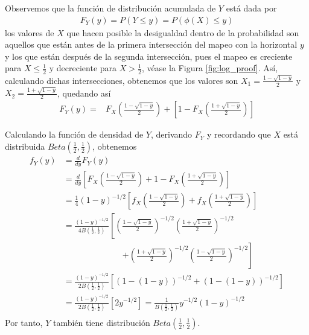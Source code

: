 \documentclass[../Main.tex]{subfiles}
\begin{document}
\begin{demostracion}{}{}
Observemos que la función de distribución acumulada de $Y$ está dada por \begin{align*}
    F_Y(y)=P(Y\leq y)=P(\phi(X)\leq y)
\end{align*}
los valores de $X$ que hacen posible la desigualdad dentro de la probabilidad son aquellos que están antes de la primera intersección del mapeo con la horizontal $y$ y los que están después de la segunda intersección, pues el mapeo es creciente para $X\leq \frac{1}{2}$ y decreciente para $X>\frac{1}{2}$, véase la Figura \ref{fig:log_proof}. Así, calculando dichas intersecciones, obtenemos que los valores son $X_1=\frac{1-\sqrt{1-y}}{2}$ y $X_2=\frac{1+\sqrt{1-y}}{2}$, quedando así 
\begin{align*}
    F_Y(y)=&F_X\left(\frac{1-\sqrt{1-y}}{2}\right)+\left[1-F_X\left(\frac{1+\sqrt{1-y}}{2}\right)\right]
\end{align*}

Calculando la función de densidad de $Y$, derivando $F_Y$ y recordando que $X$ está distribuida $Beta\left(\frac{1}{2},\frac{1}{2}\right)$, obtenemos
\begin{align*}
f_Y(y) &= \frac{d}{dy} F_Y(y) \\
       &= \frac{d}{dy} \left[ F_X\left( \frac{1 - \sqrt{1 - y}}{2} \right) + 1 - F_X\left( \frac{1 + \sqrt{1 - y}}{2} \right) \right] \\
       &= \frac{1}{4} (1 - y)^{-1/2} \left[ f_X\left( \frac{1 - \sqrt{1 - y}}{2} \right) + f_X\left( \frac{1 + \sqrt{1 - y}}{2} \right) \right] \\
       &= \frac{(1 - y)^{-1/2}}{4B\left( \frac{1}{2}, \frac{1}{2} \right)} \left[ \left( \frac{1 - \sqrt{1 - y}}{2} \right)^{-1/2}\left( \frac{1 + \sqrt{1 - y}}{2} \right)^{-1/2} \right. \\
       & \qquad\qquad\qquad\quad \left. + \left( \frac{1 + \sqrt{1 - y}}{2} \right)^{-1/2}\left( \frac{1 - \sqrt{1 - y}}{2} \right)^{-1/2} \right] \\
       &= \frac{(1 - y)^{-1/2}}{2B\left( \frac{1}{2}, \frac{1}{2} \right)} \left[ \left( 1 - (1 - y) \right)^{-1/2} + \left( 1 - (1 - y) \right)^{-1/2} \right] \\
       &= \frac{(1 - y)^{-1/2}}{2B\left( \frac{1}{2}, \frac{1}{2} \right)} \left[ 2y^{-1/2} \right]=  \frac{1}{B\left( \frac{1}{2}, \frac{1}{2} \right)}  y^{-1/2}(1 - y)^{-1/2} \\
\end{align*}
 Por tanto, $Y$ también tiene distribución $Beta\left(\frac{1}{2},\frac{1}{2}\right)$. 
\end{demostracion}
\end{document}
